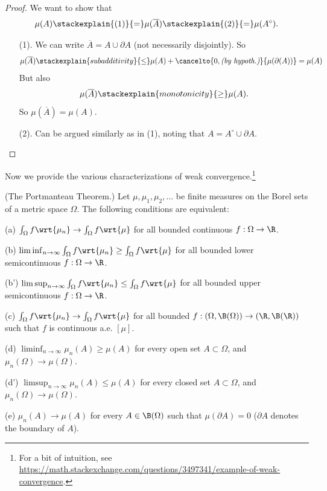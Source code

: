 \documentclass{article} %
\newcommand{\interior}[1]{{#1}^\circ}
\begin{document}
\begin{proof}
We want to show that 
\[\mu(A) \stackexplain{(1)}{=} \mu(\overline{A}) \stackexplain{(2)}{=} \mu(\interior{A}).\] 
\begin{itemize}
\item [(1).] We can write $\overline{A} = A \cup \partial A$ (not necessarily disjointly). 	 So
\[ \mu(\overline{A}) \stackexplain{subadditivity}{\leq} \mu(A) + \cancelto{0, \textit{(by hypoth.)}}{\mu(\partial(A))} = \mu(A)\]
But also 
\[ \mu(\overline{A}) \stackexplain{monotonicity}{\geq} \mu(A).  \]
So $\mu(\overline{A}) = \mu(A)$. 
\item [(2).] Can be argued similarly as in (1), noting that $A = \interior{A} \cup \partial A$.
\end{itemize}

\end{proof}


Now we provide the various characterizations of weak convergence.\footnote{For a bit of intuition, see \url{https://math.stackexchange.com/questions/3497341/example-of-weak-convergence}.}

\begin{theorem}{\textnormal{(The Portmanteau Theorem.)}}
Let $\mu, \mu_1, \mu_2, \hdots$ be finite measures on the Borel sets of a metric space $\Omega$. The following conditions are equivalent:
\begin{alphabate}
\item[(a)] $\int_\Omega f \wrt{\mu_n} \to \int_\Omega f \wrt{\mu} $ for all bounded continuous $f: \Omega \to \R$.
\item[(b)] $\liminf_{n \to \infty} \int_\Omega f \wrt{\mu_n} \geq \int_\Omega f \wrt{\mu} $ for all bounded lower semicontinuous $f: \Omega \to \R$.
\item[(b')] $\limsup_{n \to \infty} \int_\Omega f \wrt{\mu_n} \leq \int_\Omega f \wrt{\mu} $ for all bounded upper semicontinuous $f: \Omega \to \R$.
\item[(c)]  $\int_\Omega f \wrt{\mu_n} \to \int_\Omega f \wrt{\mu} $ for all bounded $f: (\Omega, \B(\Omega)) \to (\R, \B(\R))$ such that $f$ is continuous a.e. $[\mu]$.
\item[(d)] $\liminf_{n \to \infty} \mu_n(A) \geq \mu(A)$ for every open set $A \subset \Omega$, and $\mu_n(\Omega) \to \mu(\Omega).$
\item[(d')] $\limsup_{n \to \infty} \mu_n(A) \leq \mu(A)$ for every closed set $A \subset \Omega$, and $\mu_n(\Omega) \to \mu(\Omega).$
\item[(e)] $\mu_n(A) \to \mu(A)$ for every $A \in \B(\Omega)$ such that $\mu(\partial A) =0$ ($\partial A$ denotes the boundary of $A$).
\end{alphabate}
\label{thm:weak_convergence}	
\end{theorem}
\end{document}
